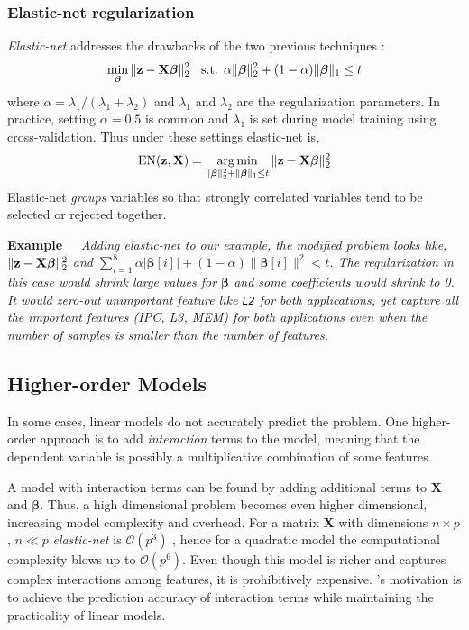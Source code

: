 \subsubsection{Elastic-net regularization}
\label{sec:est:elastic-net}
\textit{Elastic-net} addresses the drawbacks of the two previous
techniques \cite{zou2005regularization}:
\begin{equation}
\label{eq:elastic-net}
\min_{\boldsymbol{\beta}} \|\mathbf{z} - \mathbf{X}\boldsymbol{\beta} \|^2_2 \;\; \text{  s.t.  }
\alpha \| \boldsymbol{\beta} \|^2_2 + (1-\alpha)\| \boldsymbol{\beta} \|_1 \leq t
\end{equation}
where $\alpha = {\lambda_1}/({\lambda_1+\lambda_2})$ and $\lambda_1$
and $\lambda_2$ are the regularization parameters. In practice,
setting $\alpha = 0.5$ is common and $\lambda_1$ is set during model
training using cross-validation. Thus under these settings elastic-net
is,
\begin{equation}
\label{eq:elastic-net2}
\text{EN}(\mathbf{z}, \mathbf{X}) = \operatorname*{arg\,min}_{  \| \boldsymbol{\beta} \|^2_2 + \| \boldsymbol{\beta} \|_1 \leq t  } \|\mathbf{z} - \mathbf{X}\boldsymbol{\beta}\|^2_2
\end{equation}
Elastic-net \emph{groups} variables so that strongly correlated
variables tend to be selected or rejected together.

\noindent \textbf{Example~~}\textit{ Adding elastic-net to our
  example, the modified problem looks like, $\|\mathbf{z} -
  \mathbf{X}\boldsymbol{\beta}\|^2_2$ and $\sum_{i=1}^8 \alpha
  |\boldsymbol{\beta}[i]| + (1-\alpha)\|\boldsymbol{\beta}[i]\|^2<t$.
  The regularization in this case would shrink large values for
  $\boldsymbol{\beta}$ and some coefficients would shrink to 0. It
  would zero-out unimportant feature like \texttt{L2} for both
  applications, yet capture all the important features (IPC, L3, MEM)
  for both applications even when the number of samples is smaller
  than the number of features.  }

\subsection{Higher-order Models}
In some cases, linear models do not accurately predict the problem.
One higher-order approach is to add \emph{interaction} terms to the
model, meaning that the dependent variable is possibly a
multiplicative combination of some features.

A model with interaction terms can be found by adding additional terms
to $\mathbf{X}$ and $\mathbf{\beta}$.  Thus, a high dimensional
problem becomes even higher dimensional, increasing model complexity
and overhead. For a matrix $\mathbf{X}$ with dimensions $n \times p$,
$n \ll p$ \textit{elastic-net} is $\mathcal{O}(p^3)$
\cite{zou2005regularization}, hence for a quadratic model the
computational complexity blows up to $\mathcal{O}(p^6)$.  Even though
this model is richer and captures complex interactions among features,
it is prohibitively expensive.  \SYSTEMESP{}'s motivation is to achieve
the prediction accuracy of interaction terms while maintaining the
practicality of linear models.

